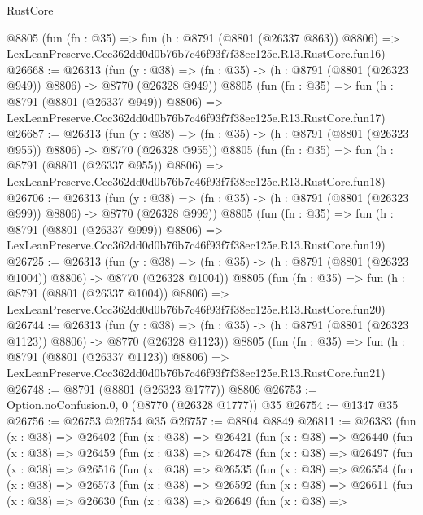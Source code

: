 \begin{lexlean}{RustCore}
\begin{coremodule}
    @8805
    (fun (fn : @35) =>
    fun (h : @8791 (@8801 (@26337 @863)) @8806) =>
    LexLeanPreserve.Ccc362dd0d0b76b7c46f93f7f38ec125e.R13.RustCore.fun16)
@26668 := @26313
    (fun (y : @38) => (fn : @35) -> (h : @8791 (@8801 (@26323 @949)) @8806) -> @8770 (@26328 @949))
    @8805
    (fun (fn : @35) =>
    fun (h : @8791 (@8801 (@26337 @949)) @8806) =>
    LexLeanPreserve.Ccc362dd0d0b76b7c46f93f7f38ec125e.R13.RustCore.fun17)
@26687 := @26313
    (fun (y : @38) => (fn : @35) -> (h : @8791 (@8801 (@26323 @955)) @8806) -> @8770 (@26328 @955))
    @8805
    (fun (fn : @35) =>
    fun (h : @8791 (@8801 (@26337 @955)) @8806) =>
    LexLeanPreserve.Ccc362dd0d0b76b7c46f93f7f38ec125e.R13.RustCore.fun18)
@26706 := @26313
    (fun (y : @38) => (fn : @35) -> (h : @8791 (@8801 (@26323 @999)) @8806) -> @8770 (@26328 @999))
    @8805
    (fun (fn : @35) =>
    fun (h : @8791 (@8801 (@26337 @999)) @8806) =>
    LexLeanPreserve.Ccc362dd0d0b76b7c46f93f7f38ec125e.R13.RustCore.fun19)
@26725 := @26313
    (fun (y : @38) =>
    (fn : @35) -> (h : @8791 (@8801 (@26323 @1004)) @8806) -> @8770 (@26328 @1004))
    @8805
    (fun (fn : @35) =>
    fun (h : @8791 (@8801 (@26337 @1004)) @8806) =>
    LexLeanPreserve.Ccc362dd0d0b76b7c46f93f7f38ec125e.R13.RustCore.fun20)
@26744 := @26313
    (fun (y : @38) =>
    (fn : @35) -> (h : @8791 (@8801 (@26323 @1123)) @8806) -> @8770 (@26328 @1123))
    @8805
    (fun (fn : @35) =>
    fun (h : @8791 (@8801 (@26337 @1123)) @8806) =>
    LexLeanPreserve.Ccc362dd0d0b76b7c46f93f7f38ec125e.R13.RustCore.fun21)
@26748 := @8791 (@8801 (@26323 @1777)) @8806
@26753 := Option.noConfusion.{0, 0} (@8770 (@26328 @1777)) @35
@26754 := @1347 @35
@26756 := @26753 @26754 @35
@26757 := @8804 @8849
@26811 := @26383
    (fun (x : @38) =>
    @26402
      (fun (x : @38) =>
      @26421
        (fun (x : @38) =>
        @26440
          (fun (x : @38) =>
          @26459
            (fun (x : @38) =>
            @26478
              (fun (x : @38) =>
              @26497
                (fun (x : @38) =>
                @26516
                  (fun (x : @38) =>
                  @26535
                    (fun (x : @38) =>
                    @26554
                      (fun (x : @38) =>
                      @26573
                        (fun (x : @38) =>
                        @26592
                          (fun (x : @38) =>
                          @26611
                            (fun (x : @38) =>
                            @26630
                              (fun (x : @38) =>
                              @26649
                                (fun (x : @38) =>

\end{coremodule}
\end{lexlean}
